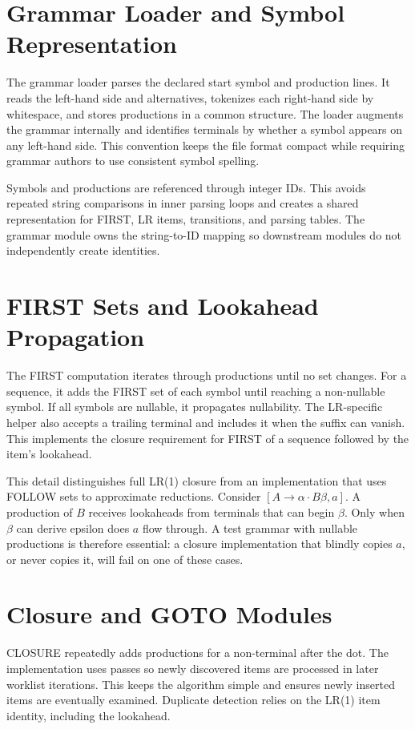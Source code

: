 \documentclass[12pt,a4paper,oneside]{report}
\begin{document}
\section{Grammar Loader and Symbol Representation}
The grammar loader parses the declared start symbol and production lines. It reads the left-hand side and alternatives, tokenizes each right-hand side by whitespace, and stores productions in a common structure. The loader augments the grammar internally and identifies terminals by whether a symbol appears on any left-hand side. This convention keeps the file format compact while requiring grammar authors to use consistent symbol spelling.

Symbols and productions are referenced through integer IDs. This avoids repeated string comparisons in inner parsing loops and creates a shared representation for FIRST, LR items, transitions, and parsing tables. The grammar module owns the string-to-ID mapping so downstream modules do not independently create identities.

\section{FIRST Sets and Lookahead Propagation}
The FIRST computation iterates through productions until no set changes. For a sequence, it adds the FIRST set of each symbol until reaching a non-nullable symbol. If all symbols are nullable, it propagates nullability. The LR-specific helper also accepts a trailing terminal and includes it when the suffix can vanish. This implements the closure requirement for FIRST of a sequence followed by the item's lookahead.

This detail distinguishes full LR(1) closure from an implementation that uses FOLLOW sets to approximate reductions. Consider $[A\to\alpha\cdot B\beta,a]$. A production of $B$ receives lookaheads from terminals that can begin $\beta$. Only when $\beta$ can derive epsilon does $a$ flow through. A test grammar with nullable productions is therefore essential: a closure implementation that blindly copies $a$, or never copies it, will fail on one of these cases.

\section{Closure and GOTO Modules}
CLOSURE repeatedly adds productions for a non-terminal after the dot. The implementation uses passes so newly discovered items are processed in later worklist iterations. This keeps the algorithm simple and ensures newly inserted items are eventually examined. Duplicate detection relies on the LR(1) item identity, including the lookahead.
\end{document}
